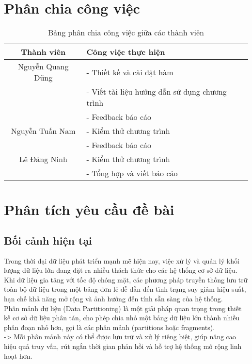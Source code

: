 \documentclass[14pt]{extarticle}
\begin{document}
\section{Phân chia công việc}
\begin{table}[H]
    \centering
    \begin{tabular}{|c|p{8cm}|}
        \hline
        \textbf{Thành viên} & \textbf{Công việc thực hiện} \\
        \hline
        Nguyễn Quang Dũng & 
        - Thiết kế và cài đặt hàm  \\
        & - Viết tài liệu hướng dẫn sử dụng chương trình \\
        & - Feedback báo cáo\\
        \hline
        Nguyễn Tuấn Nam & 
         - Kiểm thử chương trình\\&
         - Feedback báo cáo \\
        \hline
        Lê Đăng Ninh & 
        - Kiểm thử chương trình\\&
        - Tổng hợp và viết báo cáo\\
        \hline
    \end{tabular}
    \caption{Bảng phân chia công việc giữa các thành viên}
\end{table}
\newpage
\section{Phân tích yêu cầu đề bài}
\subsection{Bối cảnh hiện tại}
Trong thời đại dữ liệu phát triển mạnh mẽ hiện nay, việc xử lý và quản lý khối lượng dữ liệu lớn đang đặt ra nhiều thách thức cho các hệ thống cơ sở dữ liệu. \\

Khi dữ liệu gia tăng với tốc độ chóng mặt, các phương pháp truyền thống lưu trữ toàn bộ dữ liệu trong một bảng đơn lẻ dễ dẫn đến tình trạng suy giảm hiệu suất, hạn chế khả năng mở rộng và ảnh hưởng đến tính sẵn sàng của hệ thống.\\

Phân mảnh dữ liệu (Data Partitioning) là một giải pháp quan trọng trong thiết kế cơ sở dữ liệu phân tán, cho phép chia nhỏ một bảng dữ liệu lớn thành nhiều phân đoạn nhỏ hơn, gọi là các phân mảnh (partitions hoặc fragments). \\

-> Mỗi phân mảnh này có thể được lưu trữ và xử lý riêng biệt, giúp nâng cao hiệu quả truy vấn, rút ngắn thời gian phản hồi và hỗ trợ hệ thống mở rộng linh hoạt hơn.
\end{document}
